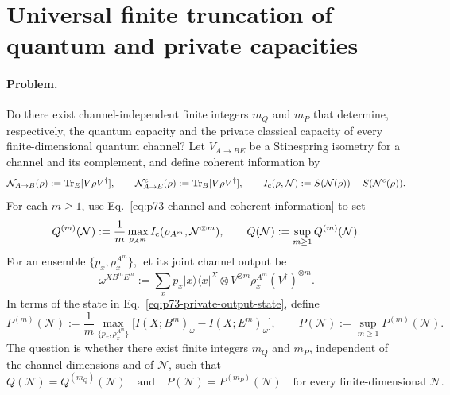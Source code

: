 \section{Universal finite truncation of quantum and private capacities}
\label{sec:op_3ea0de34a1fe6e0b}

\paragraph{Problem.}
Do there exist channel-independent finite integers $m_Q$ and $m_P$ that
determine, respectively, the quantum capacity and the private classical
capacity of every finite-dimensional quantum channel?  Let $V_{A\to BE}$ be
a Stinespring isometry for a channel and its
complement, and define coherent information by
\begin{equation}
  \mathcal N_{A\to B}(\rho):=\operatorname{Tr}_{E}[V\rho V^\dagger],
  \qquad
  \mathcal N^c_{A\to E}(\rho):=\operatorname{Tr}_{B}[V\rho V^\dagger],
  \qquad
  I_{\rm c}(\rho,\mathcal N):=
  S(\mathcal N(\rho))-S(\mathcal N^c(\rho)).
  \label{eq:p73-channel-and-coherent-information}
\end{equation}
For each $m\geq1$, use Eq.~\eqref{eq:p73-channel-and-coherent-information}
to set
\begin{equation}
  Q^{(m)}(\mathcal N)
  :=\frac1m\max_{\rho_{A^m}}
       I_{\rm c}(\rho_{A^m},\mathcal N^{\otimes m}),
  \qquad
  Q(\mathcal N):=\sup_{m\geq1}Q^{(m)}(\mathcal N).
  \label{eq:p73-quantum-regularization}
\end{equation}
For an ensemble $\{p_x,\rho_x^{A^m}\}$, let its joint channel output be
\begin{equation}
  \omega^{XB^mE^m}
  :=\sum_x p_x|x\rangle\!\langle x|^X\otimes
    V^{\otimes m}\rho_x^{A^m}(V^\dagger)^{\otimes m}.
  \label{eq:p73-private-output-state}
\end{equation}
In terms of the state in Eq.~\eqref{eq:p73-private-output-state}, define
\begin{equation}
  P^{(m)}(\mathcal N)
  :=\frac1m\max_{\{p_x,\rho_x^{A^m}\}}
       \bigl[I(X;B^m)_\omega-I(X;E^m)_\omega\bigr],
  \qquad
  P(\mathcal N):=\sup_{m\geq1}P^{(m)}(\mathcal N).
  \label{eq:p73-private-regularization}
\end{equation}
The question is whether there exist finite integers $m_Q$ and $m_P$,
independent of the channel dimensions and of $\mathcal N$, such that
\begin{equation}
  Q(\mathcal N)=Q^{(m_Q)}(\mathcal N)
  \quad\text{and}\quad
  P(\mathcal N)=P^{(m_P)}(\mathcal N)
  \quad\text{for every finite-dimensional }\mathcal N.
  \label{eq:p73-universal-truncations}
\end{equation}

